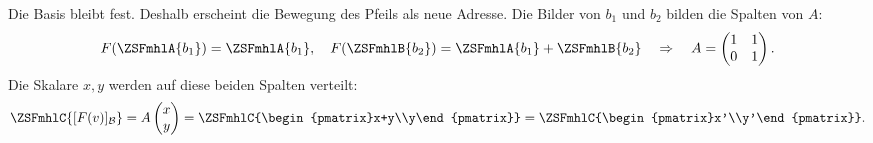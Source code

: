 \begin{defbox}
Die Basis bleibt fest. Deshalb erscheint die Bewegung des Pfeils als neue Adresse. Die Bilder von $b_1$ und $b_2$ bilden die Spalten von $A$:
\[
  F(\ZSFmhlA{b_1})=\ZSFmhlA{b_1},\quad
  F(\ZSFmhlB{b_2})=\ZSFmhlA{b_1}+\ZSFmhlB{b_2}
  \quad\Rightarrow\quad
  A=\begin{pmatrix}1&1\\0&1\end{pmatrix}.
\]
Die Skalare $x,y$ werden auf diese beiden Spalten verteilt:
\[
  \ZSFmhlC{[F(v)]_{\mathcal B}}
  =A\begin{pmatrix}x\\y\end{pmatrix}
  =\ZSFmhlC{\begin{pmatrix}x+y\\y\end{pmatrix}}
  =\ZSFmhlC{\begin{pmatrix}x'\\y'\end{pmatrix}}.
\]
\end{defbox}

